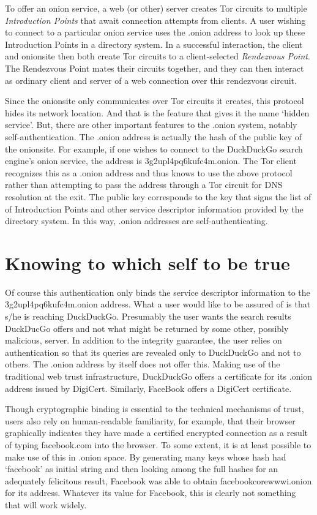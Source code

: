 \documentclass[10pt, conference, compsocconf]{styles/IEEEtran}
\begin{document}
To offer an onion service, a web (or other) server creates Tor circuits to
multiple \emph{Introduction Points} that await connection attempts
from clients. A user wishing to connect to a particular onion service
uses the .onion address to look up these Introduction Points in a
directory system. In a successful interaction, the client and
onionsite then both create Tor circuits to a client-selected
\emph{Rendezvous Point}. The Rendezvous Point mates their circuits
together, and they can then interact as ordinary client and server of
a web connection over this rendezvous circuit.

Since the onionsite only communicates over Tor circuits it creates,
this protocol hides its network location. And that is the feature that
gives it the name `hidden service'. But, there are other important
features to the .onion system, notably self-authentication. The .onion
address is actually the hash of the public key of the onionsite. For
example, if one wishes to connect to the DuckDuckGo search engine's
onion service, the address is 3g2upl4pq6kufc4m.onion. The Tor client
recognizes this as a .onion address and thus knows to use the above
protocol rather than attempting to pass the address through a Tor
circuit for DNS resolution at the exit. The public key
corresponds to the key that signs the list of of Introduction Points
and other service descriptor information provided by the directory
system. In this way, .onion addresses are self-authenticating.

\section{Knowing to which self to be true}

Of course this authentication only binds the service descriptor
information to the 3g2upl4pq6kufc4m.onion address. What a user would
like to be assured of is that s/he is reaching DuckDuckGo. Presumably
the user wants the search results DuckDucGo offers and not what might
be returned by some other, possibly malicious, server.  In addition to
the integrity guarantee, the user relies on authentication so that its
queries are revealed only to DuckDuckGo and not to others. The
.onion address by itself does not offer this.
Making use of the traditional web trust infrastructure, DuckDuckGo
offers a certificate for its .onion address issued by DigiCert.
Similarly, FaceBook offers a DigiCert certificate.

Though cryptographic binding is essential to the technical mechanisms
of trust, users also rely on human-readable familiarity, for example, that
their browser graphically indicates they have made a certified encrypted
connection as a result of typing facebook.com into the browser.  To
some extent, it is at least possible to make use of this in .onion
space. By generating many keys whose hash had `facebook' as initial
string and then looking among the full hashes for an adequately
felicitous result, Facebook was able to obtain facebookcorewwwi.onion
for its address. Whatever its value for Facebook, this is clearly not
something that will work widely.
\end{document}
